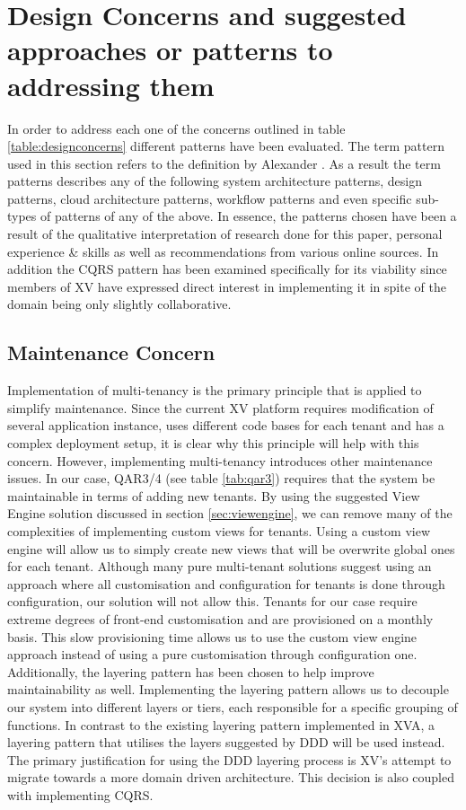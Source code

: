 \section{Design Concerns and suggested approaches or patterns to addressing them}
In order to address each one of the concerns outlined in table \ref{table:designconcerns} different patterns have been evaluated. The term pattern used in this section refers to the definition by Alexander \cite{Alexander1977-ni}. As a result the term patterns describes any of the following system architecture patterns, design patterns, cloud architecture patterns, workflow patterns and even specific sub-types of patterns of any of the above. In essence, the patterns chosen have been a result of the qualitative interpretation of research done for this paper, personal experience \& skills as well as recommendations from various online sources. In addition the CQRS pattern has been examined specifically for its viability since members of XV have expressed direct interest in implementing it in spite of the domain being only slightly collaborative. 

\subsection{Maintenance Concern}
Implementation of multi-tenancy is the primary principle that is applied to simplify maintenance. Since the current XV platform requires modification of several application instance, uses different code bases for each tenant and has a complex deployment setup, it is clear why this principle will help with this concern. However, implementing multi-tenancy introduces other maintenance issues. In our case, QAR3/4 (see table \ref{tab:qar3}) requires that the system be maintainable in terms of adding new tenants. By using the suggested View Engine solution  discussed in section \ref{sec:viewengine}, we can remove many of the complexities of implementing custom views for tenants. Using a custom view engine will allow us to simply create new views that will be overwrite global ones for each tenant. Although many pure multi-tenant solutions suggest using an approach where all customisation and configuration for tenants is done through configuration, our solution will not allow this. Tenants for our case require extreme degrees of front-end customisation and are provisioned on a monthly basis. This slow provisioning time allows us to use the custom view engine approach instead of using a pure customisation through configuration one. Additionally, the layering pattern has been chosen to help improve maintainability as well. Implementing the layering pattern allows us to decouple our system into different layers or tiers, each responsible for a specific grouping of functions. In contrast to the existing layering pattern implemented in XVA, a layering pattern that utilises the layers suggested by DDD will be used instead. The primary justification for using the DDD layering process is XV's attempt to migrate towards a more domain driven architecture. This decision is also coupled with implementing CQRS.


